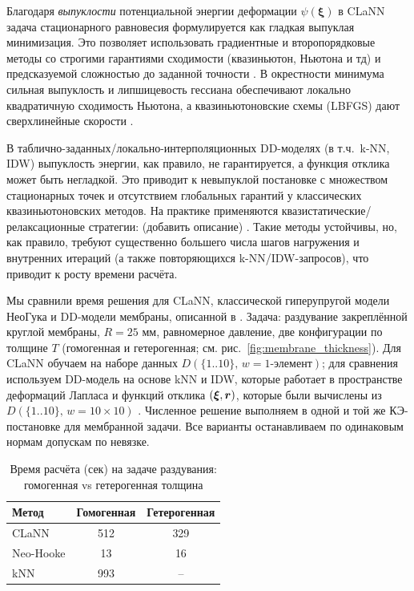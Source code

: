   Благодаря \emph{выпуклости} потенциальной энергии деформации $\psi(\boldsymbol\xi)$ в CLaNN задача стационарного равновесия формулируется
  как гладкая выпуклая минимизация. Это позволяет использовать градиентные и второпорядковые методы со строгими гарантиями сходимости
  (квазиньютон, Ньютона и тд)
  и предсказуемой сложностью до заданной точности \cite{BoydVandenberghe2004,Nesterov2004,NocedalWright2006,ConnGouldToint2000}.
  В окрестности минимума сильная выпуклость и липшицевость гессиана обеспечивают локально квадратичную сходимость Ньютона,
  а квазиньютоновские схемы (L\textendash BFGS) дают сверхлинейные скорости \cite{NocedalWright2006}.

  В таблично-заданных/локально-интерполяционных DD-моделях (в т.ч.\ k-NN, IDW) выпуклость энергии, как правило, не гарантируется,
  а функция отклика может быть негладкой. Это приводит к невыпуклой постановке с множеством стационарных точек и
  отсутствием глобальных гарантий у классических квазиньютоновских методов. На практике применяются
  квазистатические/релаксационные стратегии: (добавить описание) \cite{KirchdoerferOrtiz2016,KirchdoerferOrtiz2017}.
  Такие методы устойчивы, но, как правило, требуют существенно большего числа шагов нагружения и внутренних итераций
  (а также повторяющихся k-NN/IDW-запросов), что приводит к росту времени расчёта.

  Мы сравнили время решения для CLaNN, классической гиперупругой модели Нео\textendash Гука и DD-модели мембраны, описанной в \cite{xi2023}.
  Задача: раздувание закреплённой круглой мембраны, $R{=}25$ мм, равномерное давление, две конфигурации по толщине $T$ (гомогенная и гетерогенная; см. рис.~\ref{fig:membrane_thickness}).
  Для CLaNN обучаем на наборе данных $D(\{1..10\},\,w{=}\text{1-элемент})$; для сравнения используем DD-модель на основе 
  kNN и IDW, которые работает в пространстве деформаций Лапласа и функций отклика $(\boldsymbol{\xi}, \boldsymbol{r})$, 
  которые были вычислены из $D(\{1..10\},\,w{=}\text{10}\times\text{10})$ \cite{xi2023}.
  Численное решение выполняем в одной и той же КЭ-постановке для мембранной задачи. 
  Все варианты останавливаем по одинаковым нормам допускам по невязке.

\begin{table}[htbp]
\centering
\caption{Время расчёта (сек) на задаче раздувания: гомогенная vs гетерогенная толщина}
\label{tab:experiments_summary}
\begin{tabular}{|l|c|c|}
\hline
\textbf{Метод} & \textbf{Гомогенная} & \textbf{Гетерогенная} \\
\hline
CLaNN & 512 & 329  \\
\hline
Neo-Hooke & 13 & 16\\
\hline
kNN & 993 & -- \\
\hline
\end{tabular}
\end{table}

